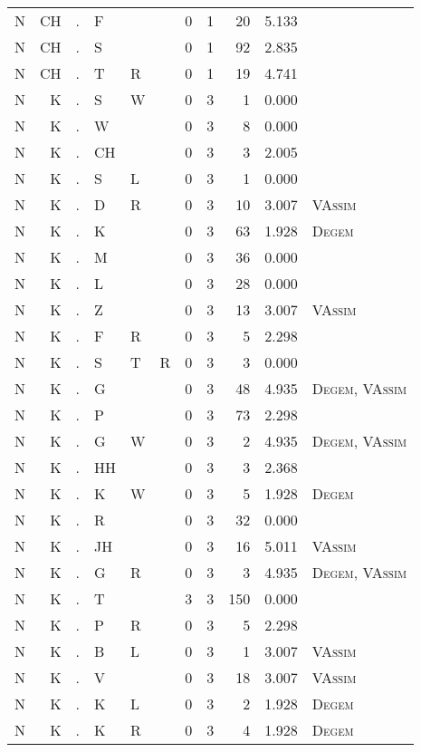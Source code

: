 \begin{longtable}{r@{ } r@{ } c@{ } l@{ } l@{ } l@{ } r r r r l }
N & CH & . & F &  &  & 0 & 1 & 20 & 5.133 &  \\
N & CH & . & S &  &  & 0 & 1 & 92 & 2.835 &  \\
N & CH & . & T & R &  & 0 & 1 & 19 & 4.741 &  \\
N & K & . & S & W &  & 0 & 3 & 1 & 0.000 &  \\
N & K & . & W &  &  & 0 & 3 & 8 & 0.000 &  \\
N & K & . & CH &  &  & 0 & 3 & 3 & 2.005 &  \\
N & K & . & S & L &  & 0 & 3 & 1 & 0.000 &  \\
N & K & . & D & R &  & 0 & 3 & 10 & 3.007 & \textsc{VAssim} \\
N & K & . & K &  &  & 0 & 3 & 63 & 1.928 & \textsc{Degem} \\
N & K & . & M &  &  & 0 & 3 & 36 & 0.000 &  \\
N & K & . & L &  &  & 0 & 3 & 28 & 0.000 &  \\
N & K & . & Z &  &  & 0 & 3 & 13 & 3.007 & \textsc{VAssim} \\
N & K & . & F & R &  & 0 & 3 & 5 & 2.298 &  \\
N & K & . & S & T & R & 0 & 3 & 3 & 0.000 &  \\
N & K & . & G &  &  & 0 & 3 & 48 & 4.935 & \textsc{Degem}, \textsc{VAssim} \\
N & K & . & P &  &  & 0 & 3 & 73 & 2.298 &  \\
N & K & . & G & W &  & 0 & 3 & 2 & 4.935 & \textsc{Degem}, \textsc{VAssim} \\
N & K & . & HH &  &  & 0 & 3 & 3 & 2.368 &  \\
N & K & . & K & W &  & 0 & 3 & 5 & 1.928 & \textsc{Degem} \\
N & K & . & R &  &  & 0 & 3 & 32 & 0.000 &  \\
N & K & . & JH &  &  & 0 & 3 & 16 & 5.011 & \textsc{VAssim} \\
N & K & . & G & R &  & 0 & 3 & 3 & 4.935 & \textsc{Degem}, \textsc{VAssim} \\
N & K & . & T &  &  & 3 & 3 & 150 & 0.000 &  \\
N & K & . & P & R &  & 0 & 3 & 5 & 2.298 &  \\
N & K & . & B & L &  & 0 & 3 & 1 & 3.007 & \textsc{VAssim} \\
N & K & . & V &  &  & 0 & 3 & 18 & 3.007 & \textsc{VAssim} \\
N & K & . & K & L &  & 0 & 3 & 2 & 1.928 & \textsc{Degem} \\
N & K & . & K & R &  & 0 & 3 & 4 & 1.928 & \textsc{Degem} \\

\end{longtable}
